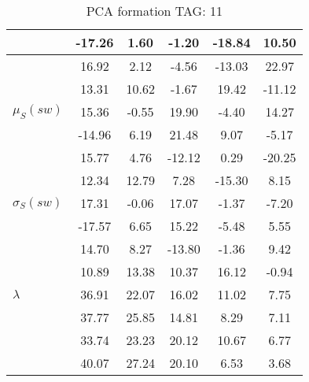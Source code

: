 \begin{table}[h!]
\begin{center}
\begin{tabular}{| l | c | c | c | c | c |}
 & -17.26  & 1.60  & -1.20  & -18.84  & 10.50 \\\hline
 & 16.92  & 2.12  & -4.56  & -13.03  & 22.97 \\\hline
 & 13.31  & 10.62  & -1.67  & 19.42  & -11.12 \\\hline
$\mu_S(sw)$ & 15.36  & -0.55  & 19.90  & -4.40  & 14.27 \\\hline
 & -14.96  & 6.19  & 21.48  & 9.07  & -5.17 \\\hline
 & 15.77  & 4.76  & -12.12  & 0.29  & -20.25 \\\hline
 & 12.34  & 12.79  & 7.28  & -15.30  & 8.15 \\\hline
$\sigma_S(sw)$ & 17.31  & -0.06  & 17.07  & -1.37  & -7.20 \\\hline
 & -17.57  & 6.65  & 15.22  & -5.48  & 5.55 \\\hline
 & 14.70  & 8.27  & -13.80  & -1.36  & 9.42 \\\hline
 & 10.89  & 13.38  & 10.37  & 16.12  & -0.94 \\\hline
$\lambda$ & 36.91  & 22.07  & 16.02  & 11.02  & 7.75 \\\hline
 & 37.77  & 25.85  & 14.81  & 8.29  & 7.11 \\\hline
 & 33.74  & 23.23  & 20.12  & 10.67  & 6.77 \\\hline
 & 40.07  & 27.24  & 20.10  & 6.53  & 3.68 \\\hline
\end{tabular}
\caption{PCA formation TAG: 11}
\end{center}
\end{table}